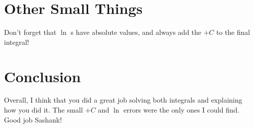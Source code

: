 \documentclass[letterpaper, 12pt]{article}
\begin{document}
\section{Other Small Things}
Don't forget that $\ln$ s have absolute values, and always add the $+C$ to the final integral!
\section{Conclusion}
Overall, I think that you did a great job solving both integrals and explaining how you did it. The small $+C$ and $\ln$ errors were the only ones I could find. Good job Sashank!
\end{document}
